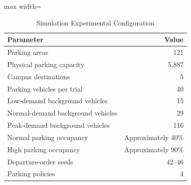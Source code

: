 \begin{table}[t]
\centering
\caption{Simulation Experimental Configuration}
\label{tab:experimental_configuration}
\small
\setlength{\tabcolsep}{4pt}
\begin{adjustbox}{max width=\columnwidth}

\begin{tabular}{lr}
\toprule
Parameter & Value\\
\midrule
Parking areas & 121\\
Physical parking capacity & 5,887\\
Campus destinations & 5\\
Parking vehicles per trial & 40\\
Low-demand background vehicles & 15\\
\addlinespace
Normal-demand background vehicles & 29\\
Peak-demand background vehicles & 116\\
Normal parking occupancy & Approximately 40\%\\
High parking occupancy & Approximately 90\%\\
Departure-order seeds & 42--46\\
\addlinespace
Parking policies & 4\\
\bottomrule
\end{tabular}
\end{adjustbox}
\end{table}
